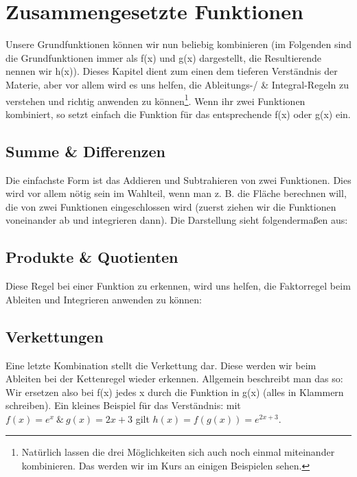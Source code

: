 \section{Zusammengesetzte Funktionen}
	Unsere Grundfunktionen können wir nun beliebig kombinieren (im Folgenden sind
	die Grundfunktionen immer als f(x) und g(x) dargestellt, die Resultierende
	nennen wir h(x)). Dieses Kapitel dient zum einen dem tieferen Verständnis der
	Materie, aber vor allem wird es uns helfen, die Ableitungs-/ \& Integral-Regeln
	zu verstehen und richtig anwenden zu können\footnote{Natürlich lassen die drei
	Möglichkeiten sich auch noch einmal miteinander kombinieren. Das werden wir im
	Kurs an einigen Beispielen sehen.}. Wenn ihr zwei Funktionen kombiniert, so
	setzt einfach die Funktion für das entsprechende f(x) oder g(x) ein.

	\subsection{Summe \& Differenzen}
		Die einfachste Form ist das Addieren und Subtrahieren von zwei Funktionen.
		Dies wird vor allem nötig sein im Wahlteil, wenn man z. B. die Fläche
		berechnen will, die von zwei Funktionen eingeschlossen wird (zuerst ziehen wir
		die Funktionen voneinander ab und integrieren dann). Die Darstellung sieht
		folgendermaßen aus:
		\formel{\[h_1(x)=f(x)+g(x), \mathrm{\ bzw\ } h_2(x)=f(x)-g(x)\]}
	
	\subsection{Produkte \& Quotienten}
		Diese Regel bei einer Funktion zu erkennen, wird uns helfen, die Faktorregel
		beim Ableiten und Integrieren anwenden zu können:
		\formel{\[h_1(x)=f(x)\cdot g(x), \mathrm{\ bzw\ } h_2(x)=\frac{f(x)}{g(x)}\]}

	\subsection{Verkettungen}
		Eine letzte Kombination stellt die Verkettung dar. Diese werden wir beim
		Ableiten bei der Kettenregel wieder erkennen. Allgemein beschreibt man das so:
		\formel{\[h(x)=f(g(x))\]}
		Wir ersetzen also bei f(x) jedes x durch die Funktion in g(x) (alles in
		Klammern schreiben). Ein kleines Beispiel für das Verständnis: mit \(f(x)=e^x\
		\&\ g(x)=2x+3\) gilt \(h(x)=f(g(x))=e^{2x+3}\).
